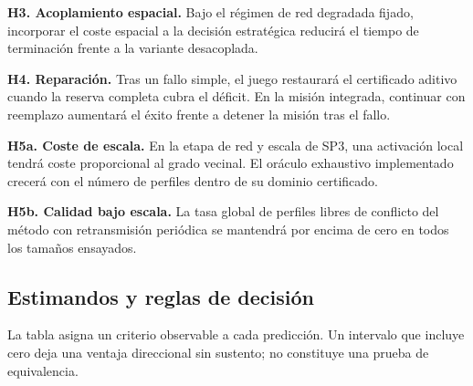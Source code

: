 \noindent\textbf{H3. Acoplamiento espacial.}
Bajo el régimen de red degradada fijado, incorporar el coste espacial a la
decisión estratégica reducirá el tiempo de terminación frente a la variante
desacoplada.

\noindent\textbf{H4. Reparación.}
Tras un fallo simple, el juego restaurará el certificado aditivo cuando la reserva
completa cubra el déficit. En la misión integrada, continuar con reemplazo
aumentará el éxito frente a detener la misión tras el fallo.

\noindent\textbf{H5a. Coste de escala.}
En la etapa de red y escala de SP3, una activación local tendrá coste proporcional al
grado vecinal. El oráculo exhaustivo implementado crecerá con el número de
perfiles dentro de su dominio certificado.

\noindent\textbf{H5b. Calidad bajo escala.}
La tasa global de perfiles libres de conflicto del método con retransmisión
periódica se mantendrá por encima de cero en todos los tamaños ensayados.

\subsection{Estimandos y reglas de decisión}

La tabla asigna un criterio observable a cada predicción. Un intervalo que
incluye cero deja una ventaja direccional sin sustento; no constituye una prueba
de equivalencia.

